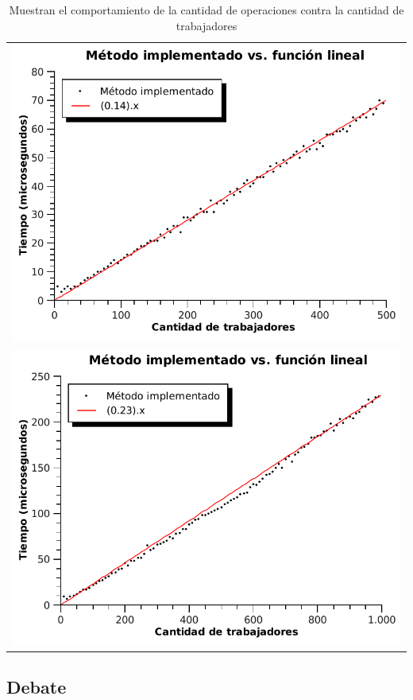 \begin{table}[ht] %
\centering %
\begin{tabular}{c}
\includegraphics[scale=0.7]{../ej3/graficos/tiempo1.pdf} \\
\includegraphics[scale=0.7]{../ej3/graficos/tiempo5.pdf}
\end{tabular}

\caption{Muestran el comportamiento de la cantidad de operaciones contra la cantidad de trabajadores} %
\label{cantOp} %
\end{table}


\subsection{Debate}
